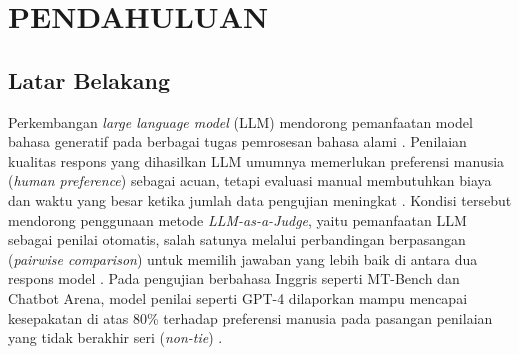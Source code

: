\chapter{PENDAHULUAN}

\section{Latar Belakang}

Perkembangan \textit{large language model} (LLM) mendorong pemanfaatan model bahasa generatif pada berbagai tugas pemrosesan bahasa alami \cite{zhengJudgingLLMasaJudgeMTBench2023}\cite{guSurveyLLMasaJudge2025}. Penilaian kualitas respons yang dihasilkan LLM umumnya memerlukan preferensi manusia (\textit{human preference}) sebagai acuan, tetapi evaluasi manual membutuhkan biaya dan waktu yang besar ketika jumlah data pengujian meningkat \cite{zhengJudgingLLMasaJudgeMTBench2023}\cite{bavarescoLLMsInsteadHuman2025}. Kondisi tersebut mendorong penggunaan metode \textit{LLM-as-a-Judge}, yaitu pemanfaatan LLM sebagai penilai otomatis, salah satunya melalui perbandingan berpasangan (\textit{pairwise comparison}) untuk memilih jawaban yang lebih baik di antara dua respons model \cite{zhengJudgingLLMasaJudgeMTBench2023}\cite{liLLMsasJudgesComprehensiveSurvey2024}. Pada pengujian berbahasa Inggris seperti MT-Bench dan Chatbot Arena, model penilai seperti GPT-4 dilaporkan mampu mencapai kesepakatan di atas 80\% terhadap preferensi manusia pada pasangan penilaian yang tidak berakhir seri (\textit{non-tie}) \cite{zhengJudgingLLMasaJudgeMTBench2023}.

